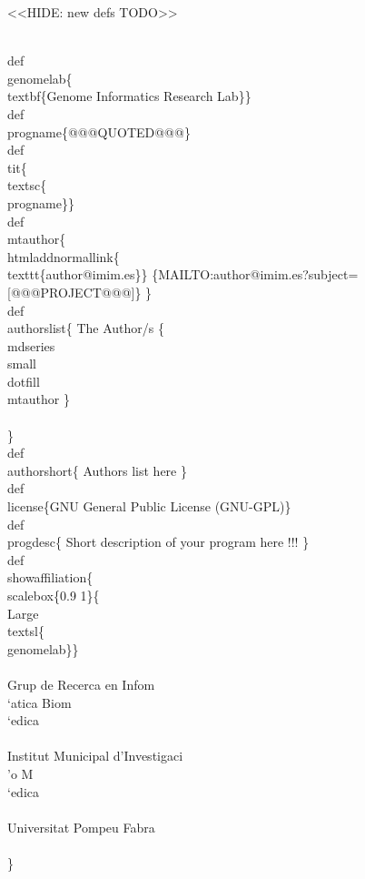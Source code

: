 \documentclass[11pt]{article}
\begin{document}
<<HIDE: new defs TODO>>

%
\\def\\genomelab\{\\textbf\{Genome Informatics Research Lab\}\}
\\def\\progname\{@@@QUOTED@@@\}
\\def\\tit\{\\textsc\{\\progname\}\}
%
\\def\\mtauthor\{
 \\htmladdnormallink\{\\texttt\{author@imim.es\}\}
                   \{MAILTO:author@imim.es?subject=[@@@PROJECT@@@]\}
 \} %
%
\\def\\authorslist\{
 The Author/s \{\\mdseries\\small\\dotfill \\mtauthor \} \\\\
 \} %
\\def\\authorshort\{
 Authors list here %
 \} %
%
\\def\\license\{GNU General Public License (GNU-GPL)\}
%
\\def\\progdesc\{
Short description of your program here !!!
 \} %
%
\\def\\showaffiliation\{
\\scalebox\{0.9 1\}\{\\Large\\textsl\{\\genomelab\}\}\\\\
Grup de Recerca en Infom\\`atica Biom\\`edica\\\\
Institut Municipal d'Investigaci\\'o M\\`edica\\\\
Universitat Pompeu Fabra\\\\[2ex]
 \} %
%
\end{document}
